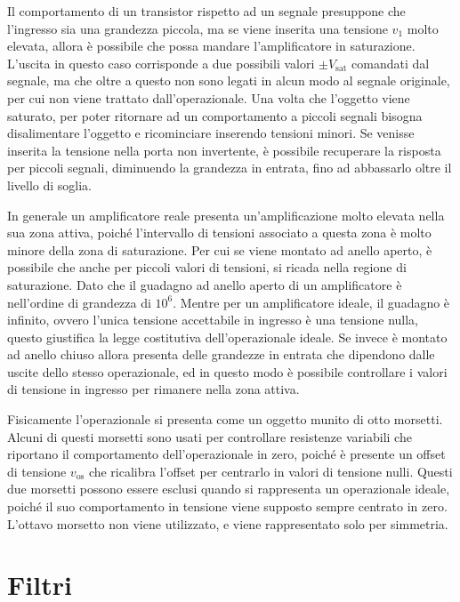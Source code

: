 \documentclass{article}
\numberwithin{equation}{subsection}
\begin{document}
Il comportamento di un transistor rispetto ad un segnale presuppone che l'ingresso sia una grandezza piccola, ma se viene inserita una tensione $v_1$ 
molto elevata, allora è possibile che possa mandare l'amplificatore in saturazione. L'uscita in questo caso corrisponde a due possibili valori $\pm V_{\mathrm{sat}}$ 
comandati dal segnale, ma che oltre a questo non sono legati in alcun modo al segnale originale, per cui non viene trattato dall'operazionale. 
Una volta che l'oggetto viene saturato, per poter ritornare ad un comportamento a piccoli segnali bisogna disalimentare l'oggetto e ricominciare 
inserendo tensioni minori.  
Se venisse inserita la tensione nella porta non invertente, è possibile recuperare la risposta per piccoli segnali, diminuendo la grandezza in entrata, 
fino ad abbassarlo oltre il livello di soglia. 

In generale un amplificatore reale presenta un'amplificazione molto elevata nella sua zona attiva, poiché l'intervallo di tensioni associato a questa zona è molto 
minore della zona di saturazione. Per cui se viene montato ad anello aperto, è possibile che anche per piccoli valori di tensioni, si ricada nella regione di saturazione. 
Dato che il guadagno ad anello aperto di un amplificatore è nell'ordine di grandezza di $10^6$. Mentre per un amplificatore ideale, il guadagno è infinito, ovvero l'unica 
tensione accettabile in ingresso è una tensione nulla, questo giustifica la legge costitutiva dell'operazionale ideale. Se invece è montato ad anello chiuso allora presenta 
delle grandezze in entrata che dipendono dalle uscite dello stesso operazionale, ed in questo modo è possibile controllare i valori di tensione in ingresso per rimanere 
nella zona attiva. 


Fisicamente l'operazionale si presenta come un oggetto munito di otto morsetti. Alcuni di questi morsetti sono usati per controllare resistenze variabili che riportano 
il comportamento dell'operazionale in zero, poiché è presente un offset di tensione $v_{\mathrm{os}}$ che ricalibra l'offset per centrarlo in valori di tensione nulli. 
Questi due morsetti possono essere esclusi quando si rappresenta un operazionale ideale, poiché il suo comportamento in tensione viene supposto sempre centrato in zero. 
L'ottavo morsetto non viene utilizzato, e viene rappresentato solo per simmetria. 

\clearpage

\section{Filtri}
\end{document}

